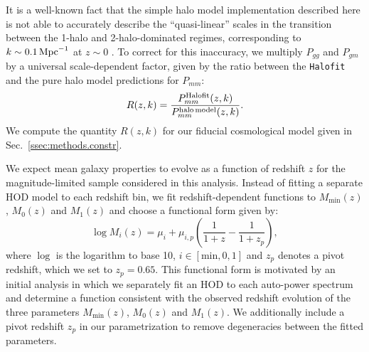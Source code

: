 \documentclass[a4paper,11pt]{article}
\begin{document}
    It is a well-known fact that the simple halo model implementation described here is not able to accurately describe the ``quasi-linear'' scales in the transition between the 1-halo and 2-halo-dominated regimes, corresponding to $k\sim0.1\,{\rm Mpc}^{-1}$ at $z\sim0$ \citep{2015MNRAS.454.1958M}. To correct for this inaccuracy, we multiply $P_{gg}$ and $P_{gm}$ by a universal scale-dependent factor, given by the ratio between the {\tt Halofit} and the pure halo model predictions for $P_{mm}$:
    \begin{equation}
      R(z,k)=\frac{P^{\rm Halofit}_{mm}(z,k)}{P^{\rm halo\,model}_{mm}(z,k)}.
    \end{equation}
We compute the quantity $R(z,k)$ for our fiducial cosmological model given in Sec.~\ref{ssec:methods.constr}.
 
    We expect mean galaxy properties to evolve as a function of redshift $z$ for the magnitude-limited sample considered in this analysis. Instead of fitting a separate HOD model to each redshift bin, we fit redshift-dependent functions to $M_{\mathrm{min}}(z)$, $M_{0}(z)$ and $M_{1}(z)$ and choose a functional form given by:
    \begin{equation}
      \log{M_{i}(z)} = \mu_{i} + \mu_{i, p} \left(\frac{1}{1+z} - \frac{1}{1+z_{p}}\right),
    \end{equation}
    where $\log$ is the logarithm to base 10, $i \in [\mathrm{min}, 0, 1]$ and $z_{p}$ denotes a pivot redshift, which we set to $z_{p} = 0.65$. This functional form is motivated by an initial analysis in which we separately fit an HOD to each auto-power spectrum and determine a function consistent with the observed redshift evolution of the three parameters $M_{\mathrm{min}}(z)$, $M_{0}(z)$ and $M_{1}(z)$. We additionally include a pivot redshift $z_{p}$ in our parametrization to remove degeneracies between the fitted parameters.
\end{document}
